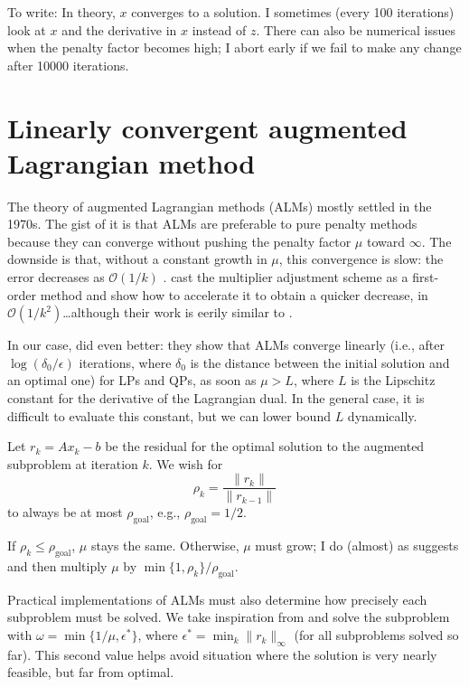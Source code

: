 \documentclass{article}
\begin{document}
To write: In theory, \(x\) converges to a solution. I sometimes (every
100 iterations) look at \(x\) and the derivative in \(x\) instead of
\(z\).  There can also be numerical issues when the penalty factor
becomes high; I abort early if we fail to make any change after 10000
iterations.

\section{Linearly convergent augmented Lagrangian method}
The theory of augmented Lagrangian methods (ALMs) mostly settled in
the 1970s.  The gist of it is that ALMs are preferable to pure
penalty methods because they can converge without pushing the penalty
factor \(\mu\) toward \(\infty\).  The downside is that, without a
constant growth in \(\mu\), this convergence is slow: the error
decreases as \(\mathcal{O}(1/k)\) \citep{Nocedal:2006uv}.
\citep{He:2010vb} cast the multiplier adjustment scheme as a
first-order method and show how to accelerate it to obtain a quicker
decrease, in \(\mathcal{O}(1/k^2)\)\ldots although their work is eerily
similar to \citep{Guler:1992tg}.

In our case, \citep{Delbos:2005tg} did even better: they show that
ALMs converge linearly (i.e., after \(\log(\delta_0/\epsilon)\)
iterations, where \(\delta_0\) is the distance between the initial
solution and an optimal one) for LPs and QPs, as soon as \(\mu>L\),
where \(L\) is the Lipschitz constant for the derivative of the
Lagrangian dual.  In the general case, it is difficult to evaluate
this constant, but we can lower bound \(L\) dynamically.

Let \(r_{k} = Ax_k-b\) be the residual for the optimal solution to
the augmented subproblem at iteration \(k\).  We wish for
\[\rho_k = \frac{\|r_k\|}{\|r_{k-1}\|}\]
to always be at most \(\rho_{\textrm{goal}}\), e.g.,
\(\rho_{\textrm{goal}} = 1/2\).

If \(\rho_k\leq \rho_{\textrm{goal}}\), \(\mu\) stays the same.
Otherwise, \(\mu\) must grow; I do (almost) as \citep{Delbos:2005tg}
suggests and then multiply \(\mu\) by
\(\min\{1,\rho_k\}/\rho_{\textrm{goal}}\).

Practical implementations of ALMs must also determine how precisely
each subproblem must be solved.  We take inspiration from
\citep{Nocedal:2006uv} and solve the subproblem with
\(\omega=\min\{1/\mu,\epsilon^*\}\), where \(\epsilon^* =
\min_k\|r_k\|_\infty\) (for all subproblems solved so far).  This
second value helps avoid situation where the solution is very nearly
feasible, but far from optimal.
\end{document}
